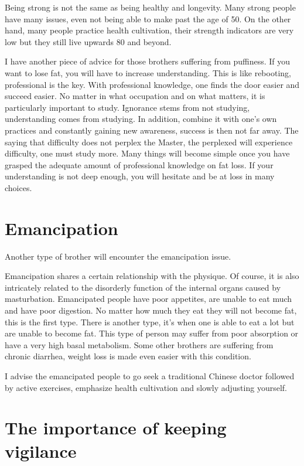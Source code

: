 \documentclass[
]{book}
\begin{document}
Being strong is not the same as being healthy and longevity. Many strong people have many issues, even not being able to make past the age of 50. On the other hand, many people practice health cultivation, their strength indicators are very low but they still live upwards 80 and beyond.

I have another piece of advice for those brothers suffering from puffiness. If you want to lose fat, you will have to increase understanding. This is like rebooting, professional is the key. With professional knowledge, one finds the door easier and succeed easier. No matter in what occupation and on what matters, it is particularly important to study. Ignorance stems from not studying, understanding comes from studying. In addition, combine it with one's own practices and constantly gaining new awareness, success is then not far away. The saying that difficulty does not perplex the Master, the perplexed will experience difficulty, one must study more. Many things will become simple once you have grasped the adequate amount of professional knowledge on fat loss. If your understanding is not deep enough, you will hesitate and be at loss in many choices.

\hypertarget{emancipation}{%
\section{Emancipation}\label{emancipation}}

Another type of brother will encounter the emancipation issue.

Emancipation shares a certain relationship with the physique. Of course, it is also intricately related to the disorderly function of the internal organs caused by masturbation. Emancipated people have poor appetites, are unable to eat much and have poor digestion. No matter how much they eat they will not become fat, this is the first type. There is another type, it's when one is able to eat a lot but are unable to become fat. This type of person may suffer from poor absorption or have a very high basal metabolism. Some other brothers are suffering from chronic diarrhea, weight loss is made even easier with this condition.

I advise the emancipated people to go seek a traditional Chinese doctor followed by active exercises, emphasize health cultivation and slowly adjusting yourself.

\hypertarget{the-importance-of-keeping-vigilance}{%
\section{The importance of keeping vigilance}\label{the-importance-of-keeping-vigilance}}
\end{document}
